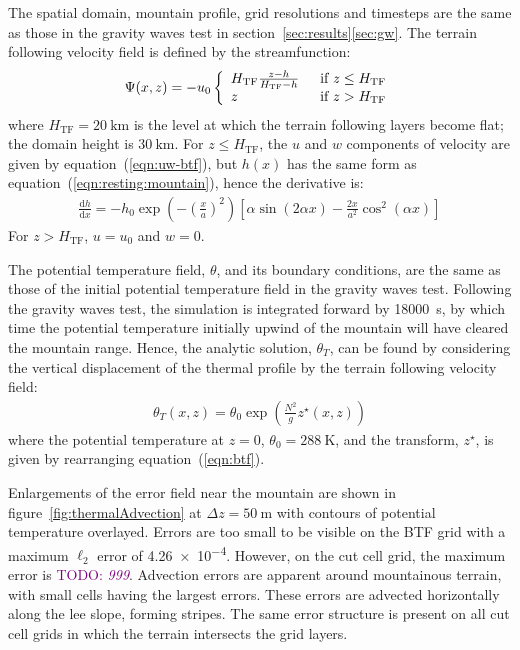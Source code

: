\documentclass{ametsoc}
\newcommand{\TODO}[1]{\textcolor{purple}{TODO: \emph{#1}}}
\begin{document}
The spatial domain, mountain profile, grid resolutions and timesteps are the same as those in the gravity waves test in section~\ref{sec:results}\ref{sec:gw}.  The terrain following velocity field is defined by the streamfunction:
\begin{align}
	\Psi(x,z) = -u_0 \left\{ \begin{array}{l l}
			H_\mathrm{TF} \frac{z - h}{H_\mathrm{TF} - h} & \enskip \text{if $z \leq H_\mathrm{TF}$} \\
			z & \enskip \text{if $z > H_\mathrm{TF}$}
	\end{array} \right.
\end{align}
where \(H_\mathrm{TF} = \SI{20}{\kilo\meter}\) is the level at which the terrain following layers become flat; the domain height is \(\SI{30}{\kilo\meter}\).
For $z \leq H_\mathrm{TF}$, the $u$ and $w$ components of velocity are given by equation~(\ref{eqn:uw-btf}), but $h(x)$ has the same form as equation~(\ref{eqn:resting:mountain}), hence the derivative is:
\begin{align}
	\frac{\mathrm{d} h}{\mathrm{d} x} = -h_0 \exp \left(- \left( \frac{x}{a} \right)^2 \right) \left[ \alpha \sin \left( 2 \alpha x \right) - \frac{2x}{a^2} \cos^2\left( \alpha x \right) \right]
\end{align}
For $z > H_\mathrm{TF}$, $u = u_0$ and $w = 0$.

The potential temperature field, \(\theta\), and its boundary conditions, are the same as those of the initial potential temperature field in the gravity waves test.
Following the gravity waves test, the simulation is integrated forward by \SI{18000}{\second}, by which time the potential temperature initially upwind of the mountain will have cleared the mountain range.
Hence, the analytic solution, $\theta_T$, can be found by considering the vertical displacement of the thermal profile by the terrain following velocity field:
\begin{align}
	\theta_T(x, z) = \theta_0 \exp \left( \frac{N^2}{g} z^\star(x, z) \right) 
\end{align}
where the potential temperature at $z = 0$, $\theta_0 = \SI{288}{\kelvin}$, and the transform, $z^\star$, is given by rearranging equation~(\ref{eqn:btf}).

Enlargements of the error field near the mountain are shown in figure~\ref{fig:thermalAdvection} at $\Delta z = \SI{50}{\meter}$ with contours of potential temperature overlayed.  Errors are too small to be visible on the BTF grid with a maximum $\ell_2$ error of \num{4.26e-4}.
However, on the cut cell grid, the maximum error is \TODO{\num{999}}.  Advection errors are apparent around mountainous terrain, with small cells having the largest errors.  These errors are advected horizontally along the lee slope, forming stripes.
The same error structure is present on all cut cell grids in which the terrain intersects the grid layers.
\end{document}

